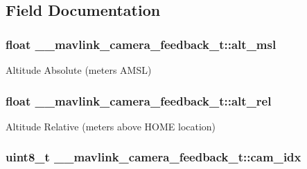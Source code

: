 \subsection{Field Documentation}
\hypertarget{struct____mavlink__camera__feedback__t_a07e3f05f73fe56333fdae42f50351ce2}{
\subsubsection[{alt\+\_\+msl}]{\setlength{\rightskip}{0pt plus 5cm}float \+\_\+\+\_\+mavlink\+\_\+camera\+\_\+feedback\+\_\+t\+::alt\+\_\+msl}}\label{struct____mavlink__camera__feedback__t_a07e3f05f73fe56333fdae42f50351ce2}


Altitude Absolute (meters A\+M\+S\+L) 

\hypertarget{struct____mavlink__camera__feedback__t_a312d7734acbc100cec56aa74a9222687}{
\subsubsection[{alt\+\_\+rel}]{\setlength{\rightskip}{0pt plus 5cm}float \+\_\+\+\_\+mavlink\+\_\+camera\+\_\+feedback\+\_\+t\+::alt\+\_\+rel}}\label{struct____mavlink__camera__feedback__t_a312d7734acbc100cec56aa74a9222687}


Altitude Relative (meters above H\+O\+M\+E location) 

\hypertarget{struct____mavlink__camera__feedback__t_aca9f2e031d88e805f6b478317e85c0e1}{
\subsubsection[{cam\+\_\+idx}]{\setlength{\rightskip}{0pt plus 5cm}uint8\+\_\+t \+\_\+\+\_\+mavlink\+\_\+camera\+\_\+feedback\+\_\+t\+::cam\+\_\+idx}}\label{struct____mavlink__camera__feedback__t_aca9f2e031d88e805f6b478317e85c0e1}


